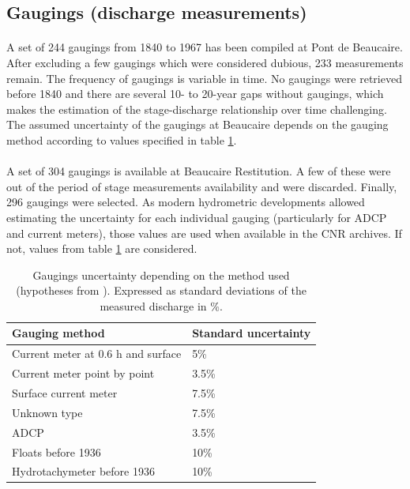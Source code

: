 \documentclass[11pt]{article}
\begin{document}
    \subsection{Gaugings (discharge measurements)}

    \paragraph{}
    A set of 244 gaugings from 1840 to 1967 has been compiled at Pont de Beaucaire. After excluding a few gaugings which were considered dubious, 233 measurements remain. The frequency of gaugings is variable in time. No gaugings were retrieved before 1840 and there are several 10- to 20-year gaps without gaugings, which makes the estimation of the stage-discharge relationship over time challenging. The assumed uncertainty of the gaugings at Beaucaire depends on the gauging method according to \citet{bard_actualisation_2018} values specified in table \ref{TabIcJau}.
    
    \paragraph{}    
    A set of 304 gaugings is available at Beaucaire Restitution. A few of these were out of the period of stage measurements availability and were discarded. Finally, 296 gaugings were selected. As modern hydrometric developments allowed estimating the uncertainty for each individual gauging (particularly for ADCP and current meters), those values are used when available in the CNR archives. If not, values from table \ref{TabIcJau} are considered. 
        
         \begin{table}[ht]
            \centering
                \begin{tabular}{| l | l |} 
                        \hline
                        \textbf{Gauging method} & \textbf{Standard uncertainty} \\
                        \hline
                        Current meter at 0.6 h and surface & 5\% \\
                        \hline
                        Current meter point by point & 3.5\% \\
                        \hline
                        Surface current meter & 7.5\% \\
                        \hline
                        Unknown type & 7.5\% \\
                        \hline
                        ADCP & 3.5\% \\
                        \hline
                        Floats before 1936 & 10\% \\
                        \hline
                        Hydrotachymeter before 1936 & 10\%\\
                        \hline
                \end{tabular}
            \caption{Gaugings uncertainty depending on the method used (hypotheses from \citet{bard_actualisation_2018}). Expressed as standard deviations of the measured discharge in \%.}
            \label{TabIcJau}
        \end{table}
         \FloatBarrier
\end{document}
